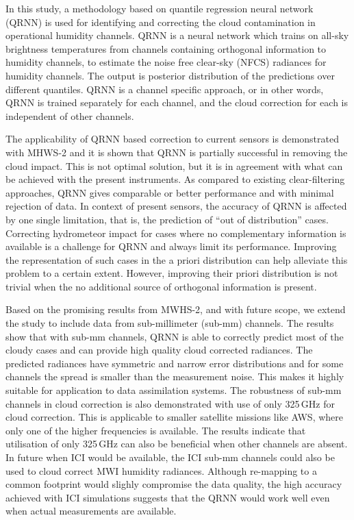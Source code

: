 \documentclass[amt, manuscript]{copernicus}
\begin{document}
In this study, a methodology based on quantile regression neural network (QRNN) is used for identifying and correcting the cloud contamination in operational humidity channels. QRNN is a neural network which trains on all-sky brightness temperatures from  channels containing orthogonal information to humidity channels, to estimate the noise free clear-sky (NFCS) radiances for humidity channels. The output is posterior distribution of the predictions over different quantiles. QRNN is a channel specific approach, or in other words, QRNN is trained separately for each channel, and the cloud correction for each is independent of other channels. 
 
The applicability of QRNN based correction to current sensors is demonstrated with MHWS-2 and it is shown that QRNN  is partially successful in removing the cloud impact. This is not optimal solution, but it is in agreement with what can be achieved with the present instruments. As compared to existing clear-filtering approaches, QRNN gives comparable or better performance and with minimal rejection of data. In context of present sensors, the accuracy of QRNN is affected by one single limitation, that is, the prediction of ``out of distribution'' cases. Correcting hydrometeor impact for cases where no complementary information is available is a challenge for QRNN and always limit its performance. Improving the representation of such cases in the a priori distribution can help alleviate this problem to a certain extent. However, improving their priori distribution is not trivial when the no additional source of orthogonal information is present. 

Based on the promising results from MWHS-2, and with future scope, we extend the study to include data from sub-millimeter (sub-mm) channels. The results show that with  sub-mm channels, QRNN is able to correctly predict most of the cloudy cases and can provide high quality cloud corrected radiances. The predicted radiances have symmetric and narrow error distributions and for some channels the spread is smaller than the measurement noise. This makes it highly suitable for application to data assimilation systems.  The robustness of sub-mm channels in cloud correction is also demonstrated with use of only 325\,GHz for cloud correction. This is applicable to smaller satellite missions like AWS, where only one of the higher frequencies is available. The results indicate that utilisation of only 325\,GHz can also be beneficial when other channels are absent. In future when ICI would be available, the ICI sub-mm channels could also be used to cloud correct MWI humidity radiances. Although re-mapping to a common footprint would slighly compromise the data quality, the high accuracy achieved with ICI simulations suggests that the QRNN would work well even when actual measurements are available.
\end{document}
